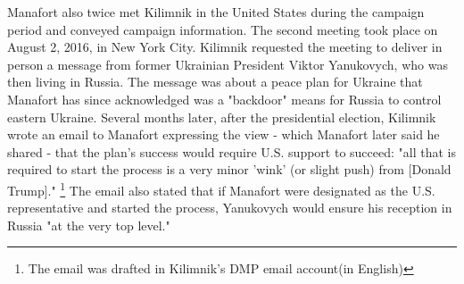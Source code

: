 Manafort also twice met Kilimnik in the United States during the campaign period and conveyed campaign information.
The second meeting took place on August 2, 2016, in New York City.
Kilimnik requested the meeting to deliver in person a message from former Ukrainian President Viktor Yanukovych, who was then living in Russia.
The message was about a peace plan for Ukraine that Manafort has since acknowledged was a "backdoor" means for Russia to control eastern Ukraine.
Several months later, after the presidential election, Kilimnik wrote an email to Manafort expressing the view - which Manafort later said he shared - that the plan's success would require U.S. support to succeed: "all that is required to start the process is a very minor 'wink' (or slight push) from [Donald Trump]."%
\footnote{The email was drafted in Kilimnik’s DMP email account(in English) }
The email also stated that if Manafort were designated as the U.S. representative and started the process, Yanukovych would ensure his reception in Russia "at the very top level."

